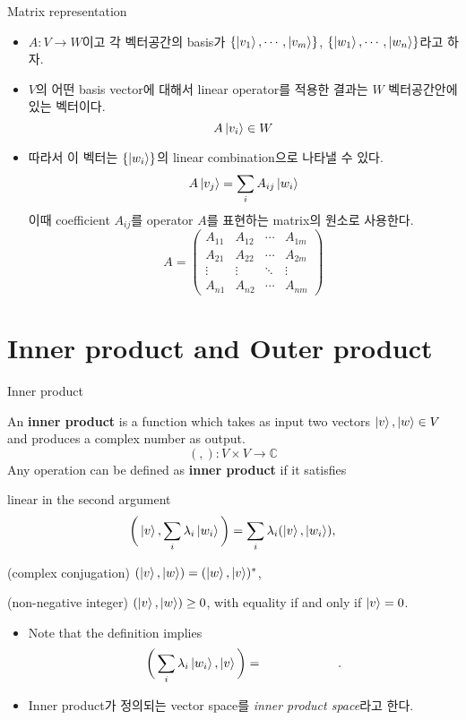 \documentclass[9pt]{beamer}
\begin{document}
    
    \begin{frame}{Matrix representation}
        \begin{itemize}
            \item $A:V \rightarrow W$이고 각 벡터공간의 basis가 $\{\ket{v_1}, \cdots, \ket{v_m}\}$, $\{\ket{w_1}, \cdots, \ket{w_n}\}$라고 하자. 
            \item $V$의 어떤 basis vector에 대해서 linear operator를 적용한 결과는 $W$ 벡터공간안에 있는 벡터이다. $$A\ket{v_i} \in W$$
            \item 따라서 이 벡터는 $\{\ket{w_i}\}$의 linear combination으로 나타낼 수 있다. 
            $$A\ket{v_j} = \sum_{i}A_{ij} \ket{w_i}$$
            이때 coefficient $A_{ij}$를 operator $A$를 표현하는 matrix의 원소로 사용한다. 
            $$ A = \begin{pmatrix} A_{11} & A_{12} & \cdots &  A_{1m} \\ A_{21} & A_{22} & \cdots &  A_{2m}  \\ \vdots  & \vdots & \ddots &  \vdots \\ A_{n1} & A_{n2} & \cdots &  A_{nm}  \end{pmatrix}$$
        \end{itemize}
    \end{frame}

    \section{Inner product and Outer product}
    \begin{frame}{Inner product}
        \begin{definition}
            An \textbf{inner product} is a function which takes as input two vectors $\ket v, \ket w \in V$ and produces a complex number as output.
            $$(,) : V \times V \rightarrow \mathbb C$$
            Any operation can be defined as \textbf{inner product} if it satisfies
            \itemize
                \item linear in the second argument
                $$\bigg(\ket v, \sum_i \lambda_i \ket{w_i}\bigg) = \sum_i \lambda_i (\ket v, \ket{w_i}),$$
                \item (complex conjugation) $(\ket v, \ket w) = (\ket w , \ket v)^*$,
                \item (non-negative integer) $(\ket v, \ket w) \ge 0$,
                with equality if and only if $\ket v = 0$.
        \end{definition}
        \begin{itemize}
            \item Note that the definition implies
            $$ \bigg(\sum_i \lambda_i \ket{w_i}, \ket v \bigg) = \qquad \qquad \qquad .$$
            \item Inner product가 정의되는 vector space를 \textit{inner product space}라고 한다.
        \end{itemize}
    \end{frame}
\end{document}
